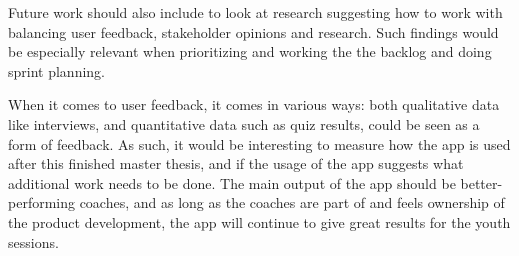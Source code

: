 Future work should also include to look at research suggesting how to work with balancing user feedback, stakeholder opinions and research. Such findings would be especially relevant when prioritizing and working the the backlog and doing sprint planning.

When it comes to user feedback, it comes in various ways: both qualitative data like interviews, and quantitative data such as quiz results, could be seen as a form of feedback. As such, it would be interesting to measure how the app is used after this finished master thesis, and if the usage of the app suggests what additional work needs to be done. The main output of the app should be better-performing coaches, and as long as the coaches are part of and feels ownership of the product development, the app will continue to give great results for the youth sessions.



